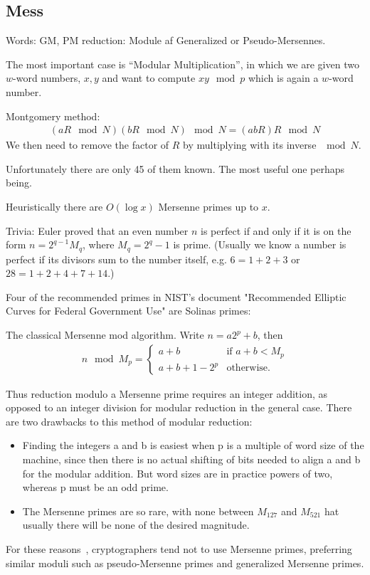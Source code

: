 \subsection{Mess}

Words:
 GM, PM reduction: Module af Generalized or Pseudo-Mersennes.

The most important case is ``Modular Multiplication'', in which we are given two $w$-word numbers, $x,y$ and want to compute $xy\mod p$ which is again a $w$-word number.

Montgomery method:
\begin{align}
   (aR\mod N)(bR\mod N) \mod N = (abR)R \mod N
\end{align}
We then need to remove the factor of $R$ by multiplying with its inverse $\mod N$.



Unfortunately there are only 45 of them known.
The most useful one perhaps being.

Heuristically there are $O(\log x)$ Mersenne primes up to $x$.


Trivia:
Euler proved that an even number $n$ is perfect if and only if it is on the form $n=2^{q-1}M_q$, where $M_q=2^q-1$ is prime.
(Usually we know a number is perfect if its divisors sum to the number itself, e.g. $6=1+2+3$ or $28=1+2+4+7+14$.)

Four of the recommended primes in NIST's document "Recommended Elliptic Curves for Federal Government Use" are Solinas primes:



The classical Mersenne mod algorithm.
Write $n = a2^p + b$, then
\begin{align}
   n \mod M_p = \begin{cases}
      a + b & \text{if } a+b<M_p\\
      a + b + 1 - 2^p & \text{otherwise}.
   \end{cases}
\end{align}

Thus reduction modulo a Mersenne prime requires an
integer addition, as opposed to an integer division for
modular reduction in the general case. There are two
drawbacks to this method of modular reduction:
\begin{itemize}
   \item Finding the integers a and b is easiest when p is a multiple of word size of the machine, since then there is
no actual shifting of bits needed to align a and b for
the modular addition. But word sizes are in practice
powers of two, whereas p must be an odd prime.
   \item The Mersenne primes are so rare, with none between
      $M_{127}$ and $M_{521}$ hat usually there will be none of the desired magnitude.
\end{itemize}
For these reasons~\cite{van2014encyclopedia}, cryptographers tend not to use Mersenne primes, preferring similar moduli such as pseudo-Mersenne primes and generalized Mersenne primes.

